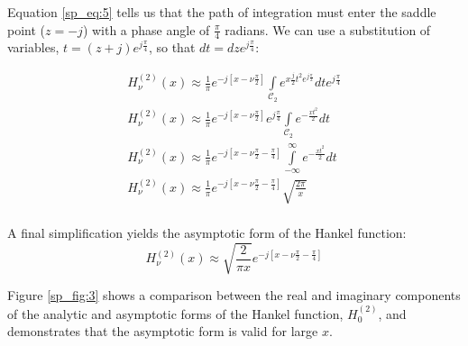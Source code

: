 Equation \ref{sp_eq:5} tells us that the path of integration must enter the saddle point ($z=-j$) with a phase angle of $\frac{\pi}{4}$ radians. We can use a substitution of variables, $t=(z+j)e^{j\frac{\pi}{4}}$, so that $dt = dze^{j\frac{\pi}{4}}$:

\begin{equation}
  \begin{gathered}
    H_{\nu}^{(2)}(x) \approx \frac{1}{\pi}e^{-j\left[x - \nu\frac{\pi}{2}\right]}\int\limits_{\mathcal{C}_2}e^{x\frac{j}{2}t^2e^{j\frac{\pi}{2}}} dte^{j\frac{\pi}{4}} \\
    H_{\nu}^{(2)}(x) \approx \frac{1}{\pi}e^{-j\left[x - \nu\frac{\pi}{2}\right]}e^{j\frac{\pi}{4}}\int\limits_{\mathcal{C}_2}e^{-\frac{xt^2}{2}} dt \\
     H_{\nu}^{(2)}(x) \approx  \frac{1}{\pi}e^{-j\left[x - \nu\frac{\pi}{2} - \frac{\pi}{4}\right]}\int\limits_{-\infty}^{\infty}e^{-\frac{xt^2}{2}} dt \\
    H_{\nu}^{(2)}(x) \approx \frac{1}{\pi}e^{-j\left[x - \nu\frac{\pi}{2} - \frac{\pi}{4}\right]}\sqrt{\frac{2\pi}{x}}\\
    \end{gathered}
  \label{sp_eq:6}
  \end{equation}
\renewcommand{\baselinestretch}{2} \small\normalsize

\noindent A final simplification yields the asymptotic form of the Hankel function:
\begin{equation}
    \boxed{H_{\nu}^{(2)}(x) \approx \sqrt{\frac{2}{\pi x}}e^{-j\left[x - \nu\frac{\pi}{2} - \frac{\pi}{4}\right]}}
  \label{sp_eq:7}
  \end{equation}
\renewcommand{\baselinestretch}{2} \small\normalsize

Figure \ref{sp_fig:3} shows a comparison between the real and imaginary components of the analytic and asymptotic forms of the Hankel function, $H_0^{(2)}$, and demonstrates that the asymptotic form is valid for large $x$.

